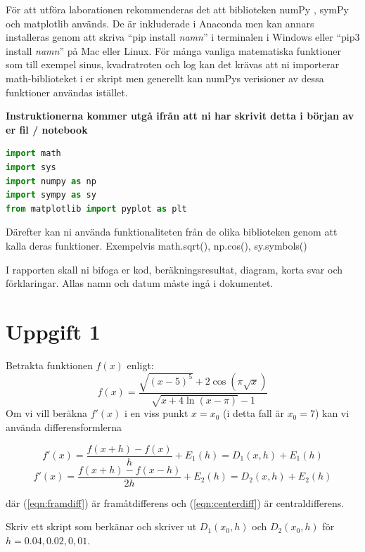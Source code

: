 \documentclass[a4paper]{article}
\begin{document}
För att utföra laborationen rekommenderas det att biblioteken numPy \cite{numpy-main},
symPy \cite{sympy-main} och matplotlib \cite{matplotlib-main} används. De är inkluderade i Anaconda men kan annars installeras genom att
skriva ``pip install \textit{namn}'' i terminalen i Windows eller ``pip3 install \textit{namn}'' på Mac eller Linux. 
För många vanliga matematiska funktioner som till
exempel sinus, kvadratroten och log kan det krävas att ni importerar math-biblioteket i er skript men generellt kan numPys
verisioner av dessa funktioner användas istället.

\textbf{Instruktionerna kommer utgå ifrån att ni har skrivit detta i början av er fil / notebook}
\begin{lstlisting}[language=Python]
import math 
import sys
import numpy as np
import sympy as sy
from matplotlib import pyplot as plt
\end{lstlisting}

Därefter kan ni använda funktionaliteten från de olika biblioteken genom att
kalla deras funktioner. Exempelvis math.sqrt(), np.cos(), sy.symbols()

I rapporten skall ni bifoga er kod, beräkningsresultat, diagram, korta svar och förklaringar.
Allas namn och datum måste ingå i dokumentet.

\newpage
\section{Uppgift 1}

Betrakta funktionen \( f(x) \) enligt:
\begin{equation} \label{eqn:fxq1}
  f(x)=\frac{\sqrt{(x-5)^5}+2\cos (\pi\sqrt{x})}{\sqrt{x+4 \ln (x-\pi)}-1}
\end{equation}
Om vi vill beräkna \( f'(x) \) i en viss punkt \( x=x_0 \)
(i detta fall är \( x_0=7 \)) kan vi använda differensformlerna

\begin{equation} \label{eqn:framdiff}
  f'(x)=\frac{f(x+h)-f(x)}{h}+E_1(h)=D_1(x,h)+E_1(h)
\end{equation}
\begin{equation} \label{eqn:centerdiff}
  f'(x)=\frac{f(x+h)-f(x-h)}{2h}+E_2(h)=D_2(x,h)+E_2(h)
\end{equation}

där (\ref{eqn:framdiff}) är framåtdifferens och (\ref{eqn:centerdiff}) är centraldifferens.

Skriv ett skript som berkänar och skriver ut \( D_1(x_0,h) \)
och  \( D_2(x_0,h) \) för \( h=0.04,0.02,0,01 \).
\end{document}
